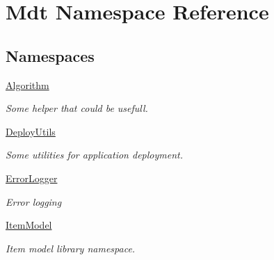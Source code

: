 \hypertarget{namespace_mdt}{}\section{Mdt Namespace Reference}
\label{namespace_mdt}
\subsection*{Namespaces}
\begin{DoxyCompactItemize}
\item 
 \hyperlink{namespace_mdt_1_1_algorithm}{Algorithm}
\begin{DoxyCompactList}\small\item\em Some helper that could be usefull. \end{DoxyCompactList}\item 
 \hyperlink{namespace_mdt_1_1_deploy_utils}{Deploy\+Utils}
\begin{DoxyCompactList}\small\item\em Some utilities for application deployment. \end{DoxyCompactList}\item 
 \hyperlink{namespace_mdt_1_1_error_logger}{Error\+Logger}
\begin{DoxyCompactList}\small\item\em Error logging \end{DoxyCompactList}\item 
 \hyperlink{namespace_mdt_1_1_item_model}{Item\+Model}
\begin{DoxyCompactList}\small\item\em Item model library namespace. \end{DoxyCompactList}\end{DoxyCompactItemize}
